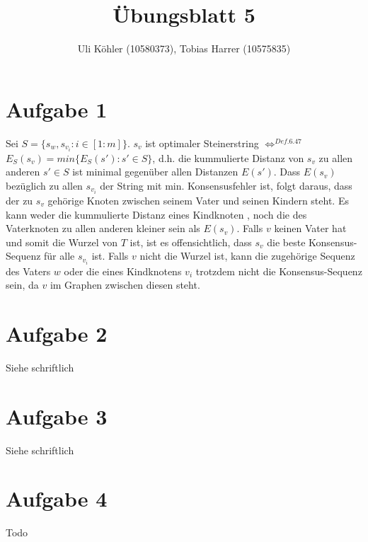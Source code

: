 \documentclass[a4paper,10pt,oneside,reqno]{scrartcl}
\title{Übungsblatt 5}
\author{Uli Köhler (10580373), Tobias Harrer (10575835)}
\begin{document}
\maketitle

\section*{Aufgabe 1}
Sei $S=\{s_w, s_{v_i} : i \in [1:m]\}$. $s_v$ ist optimaler Steinerstring $\Leftrightarrow^{Def. 6.47}$ $E_S(s_v)=min\{E_S(s') : s' \in S\}$,
d.h. die kummulierte Distanz von $s_v$ zu allen anderen $s' \in S$ ist minimal gegenüber allen Distanzen $E(s')$. Dass $E(s_v)$
bezüglich zu allen $s_{v_i}$ der String mit min. Konsensusfehler ist, folgt daraus, dass der zu $s_v$ gehörige Knoten zwischen
seinem Vater und seinen Kindern steht. Es kann weder die kummulierte Distanz eines Kindknoten , noch die des Vaterknoten zu allen
anderen kleiner sein als $E(s_v)$. Falls $v$ keinen Vater hat und somit die Wurzel von $T$ ist, ist es offensichtlich, dass $s_v$
die beste Konsensus-Sequenz für alle $s_{v_i}$ ist. Falls $v$ nicht die Wurzel ist, kann die zugehörige Sequenz des Vaters $w$
oder die eines Kindknotens $v_i$ trotzdem nicht die Konsensus-Sequenz sein, da $v$ im Graphen zwischen diesen steht.

\section*{Aufgabe 2}
Siehe schriftlich

\section*{Aufgabe 3}
Siehe schriftlich

\section*{Aufgabe 4}
Todo
\end{document}
